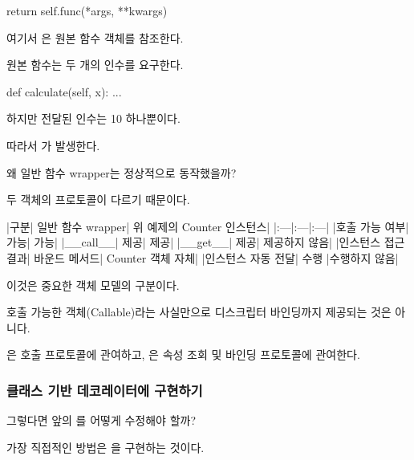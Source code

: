 \begin{dhkcode}
return self.func(*args, **kwargs)
\end{dhkcode}

여기서 은 원본  함수 객체를 참조한다.

원본 함수는 두 개의 인수를 요구한다.

\begin{dhkcode}
def calculate(self, x):
    ...
\end{dhkcode}

하지만 전달된 인수는 10 하나뿐이다.

따라서 가 발생한다.

\begin{dhknote}
\begin{dhksmry}[centered]
왜 일반 함수 wrapper는 정상적으로 동작했을까?
\end{dhksmry}
\end{dhknote}

두 객체의 프로토콜이 다르기 때문이다.

\begin{dhktable}
|구분|	일반 함수 wrapper|	위 예제의 Counter 인스턴스|
|:---|:---|:---|
|호출 가능 여부|	가능|	가능|
|__call__|	제공|	제공|
|__get__|	제공|	제공하지 않음|
|인스턴스 접근 결과|	바운드 메서드|	Counter 객체 자체|
|인스턴스 자동 전달|	수행	|수행하지 않음|
\end{dhktable}

이것은 중요한 객체 모델의 구분이다.

호출 가능한 객체(Callable)라는 사실만으로 디스크립터 바인딩까지 제공되는 것은 아니다.

은 호출 프로토콜에 관여하고, 은 속성 조회 및 바인딩 프로토콜에 관여한다.

\subsubsection{클래스 기반 데코레이터에 구현하기}

그렇다면 앞의 를 어떻게 수정해야 할까?

가장 직접적인 방법은 을 구현하는 것이다.


